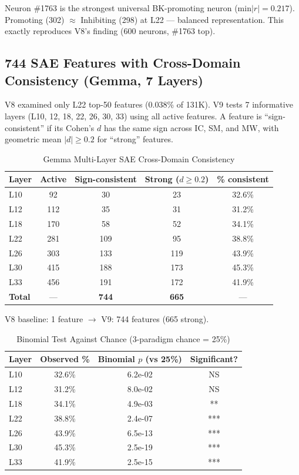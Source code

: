 \documentclass[11pt,a4paper]{article}
\begin{document}
\noindent Neuron \#1763 is the strongest universal BK-promoting neuron (min$|r|=0.217$). Promoting (302) $\approx$ Inhibiting (298) at L22 --- balanced representation. This exactly reproduces V8's finding (600 neurons, \#1763 top).

\subsection{744 SAE Features with Cross-Domain Consistency (Gemma, 7 Layers)}\label{sec:sae744}

V8 examined only L22 top-50 features (0.038\% of 131K). V9 tests 7 informative layers (L10, 12, 18, 22, 26, 30, 33) using all active features. A feature is ``sign-consistent'' if its Cohen's $d$ has the same sign across IC, SM, and MW, with geometric mean $|d| \ge 0.2$ for ``strong'' features.

\begin{table}[H]
\centering
\caption{Gemma Multi-Layer SAE Cross-Domain Consistency}\label{tab:t5}
\footnotesize
\begin{tabular}{lcccc}
\toprule
Layer & Active & Sign-consistent & Strong ($d\ge0.2$) & \% consistent \\
\midrule
L10 & 92  & 30  & 23  & 32.6\% \\
L12 & 112 & 35  & 31  & 31.2\% \\
L18 & 170 & 58  & 52  & 34.1\% \\
L22 & 281 & 109 & 95  & 38.8\% \\
L26 & 303 & 133 & 119 & 43.9\% \\
L30 & 415 & 188 & 173 & 45.3\% \\
L33 & 456 & 191 & 172 & 41.9\% \\
\midrule
\textbf{Total} & --- & \textbf{744} & \textbf{665} & --- \\
\bottomrule
\end{tabular}
\end{table}

\noindent V8 baseline: 1 feature $\rightarrow$ V9: 744 features (665 strong).

\begin{table}[H]
\centering
\caption{Binomial Test Against Chance (3-paradigm chance = 25\%)}\label{tab:t6}
\footnotesize
\begin{tabular}{lccc}
\toprule
Layer & Observed \% & Binomial $p$ (vs 25\%) & Significant? \\
\midrule
L10 & 32.6\% & 6.2e-02 & NS \\
L12 & 31.2\% & 8.0e-02 & NS \\
L18 & 34.1\% & 4.9e-03 & ** \\
L22 & 38.8\% & 2.4e-07 & *** \\
L26 & 43.9\% & 6.5e-13 & *** \\
L30 & 45.3\% & 2.5e-19 & *** \\
L33 & 41.9\% & 2.5e-15 & *** \\
\bottomrule
\end{tabular}
\end{table}
\end{document}
